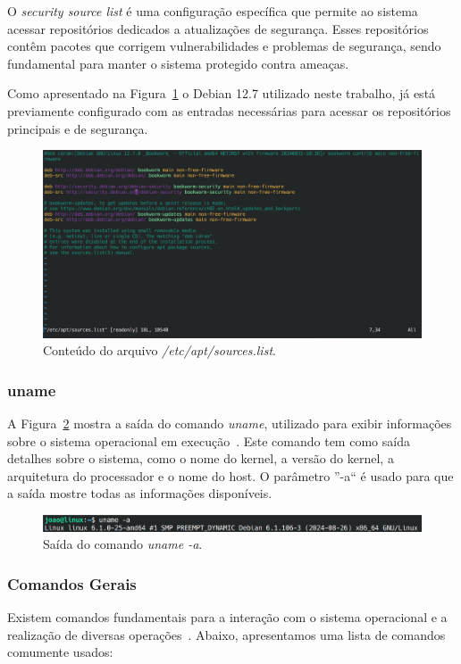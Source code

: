 \documentclass[
	12pt,				%
	oneside,   	        %
	a4paper,			%
	english,			%
	french,				%
	spanish,			%
	brazil,				%
	]{pacotes/abntex2}
\begin{document}
O \textit{security source list} é uma configuração específica que permite ao sistema acessar repositórios dedicados a atualizações de segurança. Esses repositórios contêm pacotes que corrigem vulnerabilidades e problemas de segurança, sendo fundamental para manter o sistema protegido contra ameaças. 

Como apresentado na Figura~\ref{fig:sources} o Debian 12.7 utilizado neste trabalho, já está previamente configurado com as entradas necessárias para acessar os repositórios principais e de segurança.

\begin{figure}[H]
  \centering
  \includegraphics[scale=0.3]{figuras/source_list.png}
  \caption{Conteúdo do arquivo \textit{/etc/apt/sources.list}.}
  \label{fig:sources}
\end{figure}

\subsubsection{uname}
A Figura~\ref{fig:uname} mostra a saída do comando \textit{uname}, utilizado para exibir informações sobre o sistema operacional em execução~\cite{negus2012}. Este comando tem como saída detalhes sobre o sistema, como o nome do kernel, a versão do kernel, a arquitetura do processador e o nome do host. O parâmetro ''-a`` é usado para que a saída mostre todas as informações disponíveis.

\begin{figure}[H]
  \centering
  \includegraphics[scale=0.43]{figuras/uname.png}
  \caption{Saída do comando \textit{uname -a}.}
  \label{fig:uname}
\end{figure}

\subsubsection{Comandos Gerais}
Existem comandos fundamentais para a interação com o sistema operacional e a realização de diversas operações~\cite{guiafocaIniciante}. Abaixo, apresentamos uma lista de comandos comumente usados:
\end{document}
